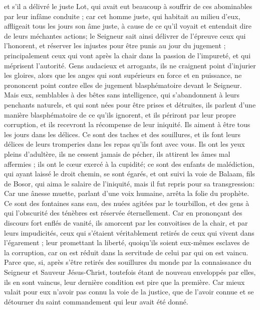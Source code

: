 \begin{multicols}{2}
et s'il a délivré le juste Lot, qui avait eut beaucoup à souffrir de ces abominables par leur infâme conduite ;
car cet homme juste, qui habitait au milieu d'eux, affligeait tous les jours son âme juste, à cause de ce qu'il voyait et entendait dire de leurs méchantes actions;
le Seigneur sait ainsi délivrer de l'épreuve ceux qui l'honorent, et réserver les injustes pour être punis au jour du jugement ;
principalement ceux qui vont après la chair dans la passion de l'impureté, et qui méprisent l'autorité. Gens audacieux et arrogants, ils ne craignent point d'injurier les gloires,
alors que les anges qui sont supérieurs en force et en puissance, ne prononcent point contre elles de jugement blasphématoire devant le Seigneur.
Mais eux, semblables à des bêtes sans intelligence, qui s'abandonnent à leurs penchants naturels, et qui sont nées pour être prises et détruites, ils parlent d'une manière blasphématoire de ce qu'ils ignorent, et ils périront par leur propre corruption,
et ils recevront la récompense de leur iniquité. Ils aiment à être tous les jours dans les délices. Ce sont des taches et des souillures, et ils font leurs délices de leurs tromperies dans les repas qu'ils font avec vous.
Ils ont les yeux pleins d'adultère, ils ne cessent jamais de pécher, ils attirent les âmes mal affermies ; ils ont le cœur exercé à la cupidité; ce sont des enfants de malédiction,
qui ayant laissé le droit chemin, se sont égarés, et ont suivi la voie de Balaam, fils de Bosor, qui aima le salaire de l'iniquité, mais il fut repris pour sa transgression:
Car une ânesse muette, parlant d'une voix humaine, arrêta la folie du prophète.
Ce sont des fontaines sans eau, des nuées agitées par le tourbillon, et des gens à qui l'obscurité des ténèbres est réservée éternellement.
Car en prononçant des discours fort enflés de vanité, ils amorcent par les convoitises de la chair, et par leurs impudicités, ceux qui s'étaient véritablement retirés de ceux qui vivent dans l'égarement ;
leur promettant la liberté, quoiqu'ils soient eux-mêmes esclaves de la corruption, car on est réduit dans la servitude de celui par qui on est vaincu.
Parce que, si, après s'être retirés des souillures du monde par la connaissance du Seigneur et Sauveur Jésus-Christ, toutefois étant de nouveau enveloppés par elles, ils en sont vaincus, leur dernière condition est pire que la première.
Car mieux valait pour eux n'avoir pas connu la voie de la justice, que de l'avoir connue et se détourner du saint commandement qui leur avait été donné.

\end{multicols}
